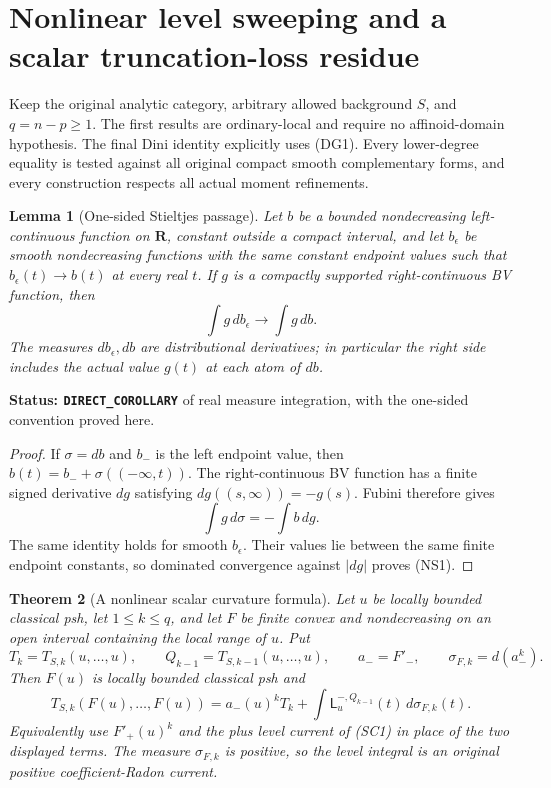 \documentclass[11pt,a4paper]{article}
\numberwithin{equation}{section}
\newtheorem{theorem}{Theorem}[section]
\newtheorem{lemma}[theorem]{Lemma}
\theoremstyle{definition}
\theoremstyle{remark}
\begin{document}


\section{Nonlinear level sweeping and a scalar truncation-loss residue}
\label{sec:r11-nonlinear-level-sweeping}

Keep the original analytic category, arbitrary allowed background $S$,
and $q=n-p\geq1$. The first results are ordinary-local and require
no affinoid-domain hypothesis. The final Dini identity explicitly
uses (DG1). Every lower-degree equality is tested against all original
compact smooth complementary forms, and every construction respects
all actual moment refinements.

\begin{lemma}[One-sided Stieltjes passage]
\label{lem:r11-one-sided-Stieltjes}
Let $b$ be a bounded nondecreasing left-continuous function on
$\mathbf R$, constant outside a compact interval, and let
$b_\epsilon$ be smooth nondecreasing functions with the same
constant endpoint values such that $b_\epsilon(t)\to b(t)$ at
every real $t$. If $g$ is a compactly supported right-continuous
BV function, then
\[
                  \int g\,db_\epsilon\longrightarrow\int g\,db.
 \tag{NS1}
\]
The measures $db_\epsilon,db$ are distributional derivatives;
in particular the right side includes the actual value $g(t)$
at each atom of $db$.
\end{lemma}

\noindent\textbf{Status: \texttt{DIRECT\_COROLLARY}} of real
measure integration, with the one-sided convention proved here.

\begin{proof}
If $\sigma=db$ and $b_-$ is the left endpoint value, then
$b(t)=b_-+\sigma((-\infty,t))$. The right-continuous BV function
has a finite signed derivative $dg$ satisfying
$dg((s,\infty))=-g(s)$. Fubini therefore gives
\[
                       \int g\,d\sigma=-\int b\,dg.
\]
The same identity holds for smooth $b_\epsilon$.
Their values lie between the same finite endpoint constants,
so dominated convergence against $|dg|$ proves (NS1).
\end{proof}

\begin{theorem}[A nonlinear scalar curvature formula]
\label{thm:r11-nonlinear-Stieltjes}
Let $u$ be locally bounded classical psh, let $1\leq k\leq q$,
and let $F$ be finite convex and nondecreasing on an open
interval containing the local range of $u$. Put
\[
 T_k=T_{S,k}(u,\ldots,u),\qquad
 Q_{k-1}=T_{S,k-1}(u,\ldots,u),\qquad a_-=F'_-,
 \qquad \sigma_{F,k}=d(a_-^k).
\]
Then $F(u)$ is locally bounded classical psh and
\[
 \boxed{\quad
 T_{S,k}(F(u),\ldots,F(u))
  =a_-(u)^kT_k+
       \int\mathsf L_u^{-,Q_{k-1}}(t)\,d\sigma_{F,k}(t).
 \quad}
 \tag{NS2}
\]
Equivalently use $F'_+(u)^k$ and the plus level current of
(SC1) in place of the two displayed terms. The measure
$\sigma_{F,k}$ is positive, so the level integral is an
original positive coefficient-Radon current.
\end{theorem}
\end{document}
